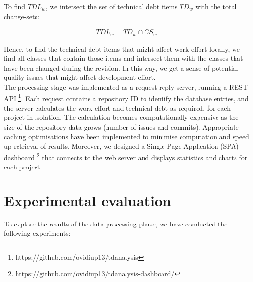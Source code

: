 \documentclass{mpaper}
\begin{document}
To find $TDL_{w}$, we intersect the set of technical debt items $TD_{w}$ with
the total change-sets:

\begin{equation}
  \label{eq-td-local}
  \begin{aligned}
    TDL_{w} = TD_{w} \cap CS_{w}
  \end{aligned}
\end{equation}

Hence, to find the technical debt items that might affect work effort locally,
we find all classes that contain those items and intersect them with the classes
that have been changed during the revision. In this way, we get a sense of
potential quality issues that might affect development effort.\\

The processing stage was implemented as a request-reply server, running a REST
API \footnote{https://github.com/ovidiup13/tdanalysis}. Each request contains a
repository ID to identify the database entries, and the server calculates the
work effort and technical debt as required, for each project in isolation. The
calculation becomes computationally expensive as the size of the repository data
grows (number of issues and commits). Appropriate caching optimisations have
been implemented to minimise computation and speed up retrieval of results.
Moreover, we designed a Single Page Application (SPA) dashboard
\footnote{https://github.com/ovidiup13/tdanalysis-dashboard/} that connects to
the web server and displays statistics and charts for each project.


\section{Experimental evaluation}
\label{evaluation}

To explore the results of the data processing phase, we have conducted the
following experiments:
\end{document}
